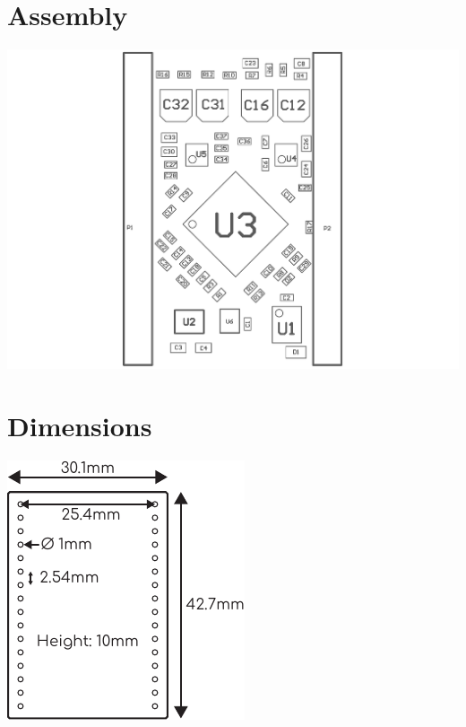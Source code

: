 \documentclass[a4paper, 10pt]{article}
\begin{document}
\section{Assembly}
\begin{center}
\vfill
\includegraphics[scale = 1]{Assembly.pdf}
\vfill
\end{center}
\newpage

\section{Dimensions}
\vfill
\begin{center}
\includegraphics[scale = 3]{FXCore_Module_Dimensions.pdf}
\end{center}
\vfill
\newpage
\end{document}
